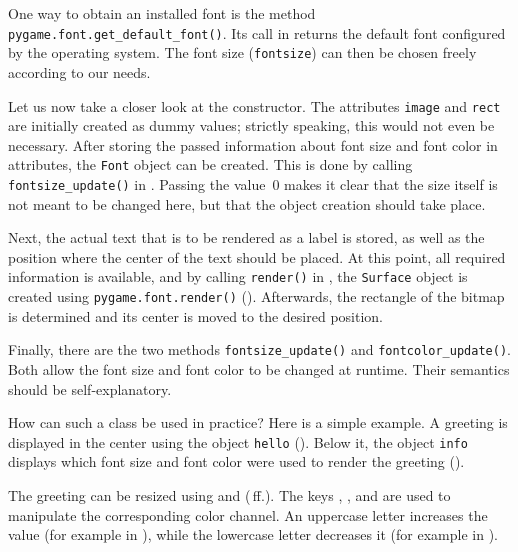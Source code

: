 One way to obtain an installed font is the method \texttt{pygame.font.get\_default\_font()}. Its call in  returns the default font configured by the operating system. The font size (\texttt{fontsize}) can then be chosen freely according to our needs.



Let us now take a closer look at the constructor. The attributes \texttt{image} and \texttt{rect} are initially created as dummy values; strictly speaking, this would not even be necessary. After storing the passed information about font size and font color in attributes, the \texttt{Font} object can be created. This is done by calling \texttt{fontsize\_update()} in . Passing the value~0 makes it clear that the size itself is not meant to be changed here, but that the object creation should take place.

Next, the actual text that is to be rendered as a label is stored, as well as the position where the center of the text should be placed. At this point, all required information is available, and by calling \texttt{render()} in , the \texttt{Surface} object is created using \texttt{pygame\-.font\-.ren\-der()} (). Afterwards, the rectangle of the bitmap is determined and its center is moved to the desired position.

Finally, there are the two methods \texttt{fontsize\_update()} and \texttt{fontcolor\_update()}. Both allow the font size and font color to be changed at runtime. Their semantics should be self-explanatory.

How can such a class be used in practice? Here is a simple example. A greeting is displayed in the center using the object \texttt{hello} (). Below it, the object \texttt{info} displays which font size and font color were used to render the greeting ().


The greeting can be resized using \keys{{+}} and \keys{{-}} (\,ff.). The keys , , and  are used to manipulate the corresponding color channel. An uppercase letter increases the value (for example in ), while the lowercase letter decreases it (for example in ).

